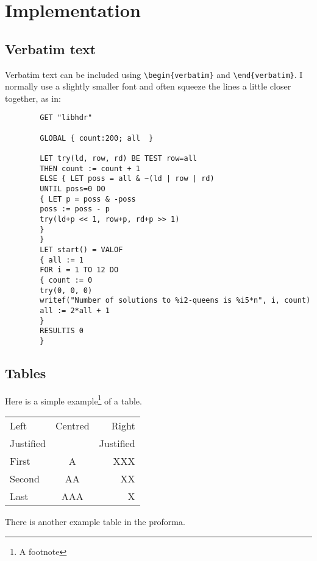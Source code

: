 \documentclass[a4paper,12pt,twoside,openright]{report}
\renewcommand{\baselinestretch}{1.1}    %
\begin{document}
	\chapter{Implementation}
	
	\section{Verbatim text}
	
	Verbatim text can be included using \verb|\begin{verbatim}| and
	\verb|\end{verbatim}|. I normally use a slightly smaller font and
	often squeeze the lines a little closer together, as in:
	
	{\renewcommand{\baselinestretch}{0.8}\small
		\begin{verbatim}
		GET "libhdr"
		
		GLOBAL { count:200; all  }
		
		LET try(ld, row, rd) BE TEST row=all
		THEN count := count + 1
		ELSE { LET poss = all & ~(ld | row | rd)
		UNTIL poss=0 DO
		{ LET p = poss & -poss
		poss := poss - p
		try(ld+p << 1, row+p, rd+p >> 1)
		}
		}
		LET start() = VALOF
		{ all := 1
		FOR i = 1 TO 12 DO
		{ count := 0
		try(0, 0, 0)
		writef("Number of solutions to %i2-queens is %i5*n", i, count)
		all := 2*all + 1
		}
		RESULTIS 0
		}
		\end{verbatim}
	}
	
	\section{Tables}
	
	\begin{samepage}
		Here is a simple example\footnote{A footnote} of a table.
		
		\begin{center}
			\begin{tabular}{l|c|r}
				Left      & Centred & Right \\
				Justified &         & Justified \\[3mm]
				First     & A       & XXX \\
				Second    & AA      & XX  \\
				Last      & AAA     & X   \\
			\end{tabular}
		\end{center}
		
		\noindent
		There is another example table in the proforma.
	\end{samepage}
	
\end{document}
